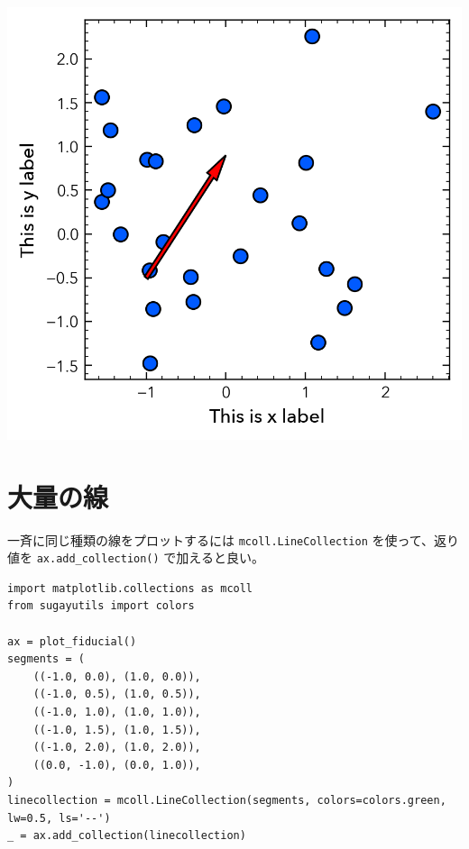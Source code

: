 \documentclass[a4paper, 10pt, notitlepage, twocolumn, uplatex, oneside, dvipdfmx]{jsarticle}
\begin{document}
\begin{center}
\includegraphics[width=1.0\linewidth]{./obipy-resources/params_arrow.png}
\end{center}
\section{大量の線}
\label{sec:org4490afc}
一斉に同じ種類の線をプロットするには \texttt{mcoll.LineCollection} を使って、返り値を \texttt{ax.add\_collection()} で加えると良い。
\begin{verbatim}
import matplotlib.collections as mcoll
from sugayutils import colors

ax = plot_fiducial()
segments = (
    ((-1.0, 0.0), (1.0, 0.0)),
    ((-1.0, 0.5), (1.0, 0.5)),
    ((-1.0, 1.0), (1.0, 1.0)),
    ((-1.0, 1.5), (1.0, 1.5)),
    ((-1.0, 2.0), (1.0, 2.0)),
    ((0.0, -1.0), (0.0, 1.0)),
)
linecollection = mcoll.LineCollection(segments, colors=colors.green, lw=0.5, ls='--')
_ = ax.add_collection(linecollection)
\end{verbatim}
\end{document}
